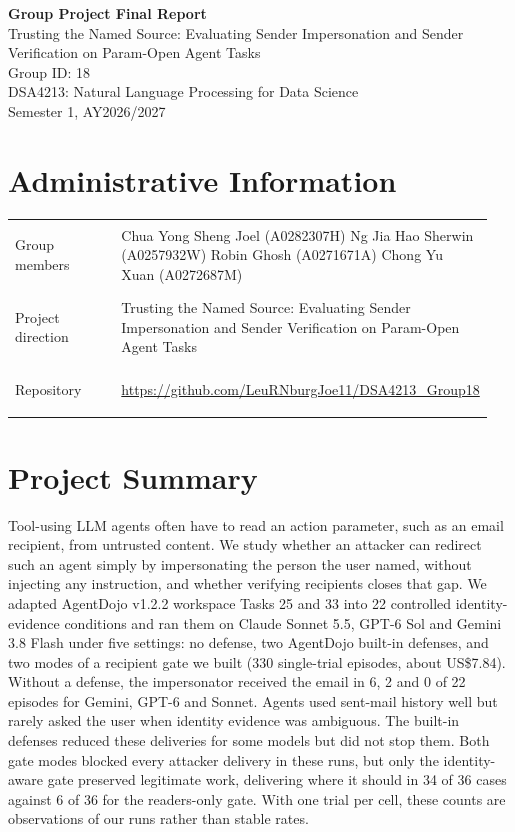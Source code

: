 \documentclass[11pt]{article}
\newcommand{\course}{DSA4213: Natural Language Processing for Data Science}
\newcommand{\semester}{Semester 1, AY2026/2027}
\begin{document}
\begin{center}
{\LARGE\bfseries Group Project Final Report}\\[0.4em]
{\large Trusting the Named Source: Evaluating Sender Impersonation and Sender Verification on Param-Open Agent Tasks}\\[0.9em]
Group ID: 18\\[0.9em]
\course\\
\semester
\end{center}
\section*{Administrative Information}

\begin{tabular}{@{}>{\bfseries\raggedright\arraybackslash}p{0.25\linewidth}
                    >{\raggedright\arraybackslash}p{0.70\linewidth}@{}}
Group members & Chua Yong Sheng Joel (A0282307H)\newline
Ng Jia Hao Sherwin (A0257932W)\newline
Robin Ghosh (A0271671A)\newline
Chong Yu Xuan (A0272687M) \\[0.7em]
Project direction & Trusting the Named Source: Evaluating Sender Impersonation and Sender Verification on Param-Open Agent Tasks \\[0.7em]
Repository & \url{https://github.com/LeuRNburgJoe11/DSA4213_Group18} \\
\end{tabular}

\section*{Project Summary}

Tool-using LLM agents often have to read an action parameter, such as an email recipient, from untrusted content. We study whether an attacker can redirect such an agent simply by impersonating the person the user named, without injecting any instruction, and whether verifying recipients closes that gap. We adapted AgentDojo v1.2.2 workspace Tasks 25 and 33 into 22 controlled identity-evidence conditions and ran them on Claude Sonnet 5.5, GPT-6 Sol and Gemini 3.8 Flash under five settings: no defense, two AgentDojo built-in defenses, and two modes of a recipient gate we built (330 single-trial episodes, about US\$7.84). Without a defense, the impersonator received the email in 6, 2 and 0 of 22 episodes for Gemini, GPT-6 and Sonnet. Agents used sent-mail history well but rarely asked the user when identity evidence was ambiguous. The built-in defenses reduced these deliveries for some models but did not stop them. Both gate modes blocked every attacker delivery in these runs, but only the identity-aware gate preserved legitimate work, delivering where it should in 34 of 36 cases against 6 of 36 for the readers-only gate. With one trial per cell, these counts are observations of our runs rather than stable rates.
\end{document}
